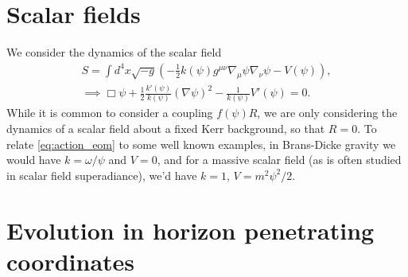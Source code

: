 \documentclass[%
 prd,
amsmath,amssymb,
preprint,%
]{revtex4-1}
\begin{document}
\section{\label{sec:scalar_fields}Scalar fields}
   We consider the dynamics of the scalar field
\begin{subequations}
\label{eq:action_eom}
\begin{align}
   \label{eq:action}
   S
   =
   \int d^4x\sqrt{-g}\left(
      -
      \frac{1}{2}k\left(\psi\right)g^{\mu\nu}\nabla_{\mu}\psi\nabla_{\nu}\psi
      -
      V\left(\psi\right)
   \right)
   ,\\
   \label{eq:eom}
   \implies
   \Box\psi
   +
   \frac{1}{2}\frac{k'\left(\psi\right)}{k\left(\psi\right)}
   \left(\nabla\psi\right)^2
   -
   \frac{1}{k\left(\psi\right)}V'\left(\psi\right)
   =
   0
   .
\end{align}
\end{subequations}
While it is common to consider a coupling $f\left(\psi\right)R$,
we are only considering the dynamics of a scalar field about
a fixed Kerr background, so that $R=0$.
To relate \eqref{eq:action_eom} to some well known examples, in
Brans-Dicke gravity we would have $k=\omega/\psi$ and $V=0$,
and for a massive scalar field (as is often studied in scalar
field superadiance), we'd have $k=1$, $V=m^2\psi^2/2$.
\section{\label{sec:coordinates}
   Evolution in horizon penetrating coordinates
   }
\end{document}
